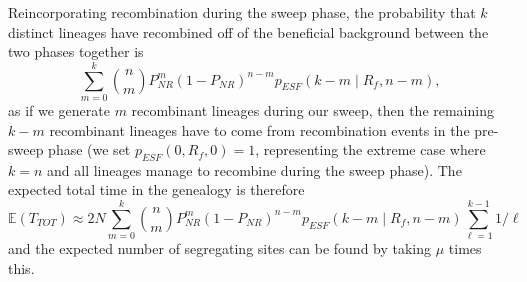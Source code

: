 \documentclass[a4paper,10pt]{article}
\begin{document}
Reincorporating recombination during the sweep phase, the probability that $k$ distinct lineages have recombined off of the beneficial background between the two phases together is
\begin{equation}
	\sum_{m=0}^{k} {n \choose m} P_{NR}^{m} (1-P_{NR})^{n-m} p_{ESF}\left(k-m\mid R_f, n-m\right),
\end{equation}
as if we generate $m$ recombinant lineages during our sweep, then the remaining $k-m$ recombinant lineages have to come from recombination events in the pre-sweep phase (we set $p_{ESF}\left(0,R_f,0\right)=1$, representing the extreme case where $k=n$ and all lineages manage to recombine during the sweep phase). The expected total time in the genealogy is therefore
\begin{equation}
\mathbb{E}(T_{TOT})  \approx 2N\sum_{m=0}^{k} {n \choose m} P_{NR}^{m} (1-P_{NR})^{n-m} p_{ESF}\left(k-m\mid R_f, n-m\right)   \sum_{\ell=1}^{k-1} 1/\ell
\end{equation}
and the expected number of segregating sites can be found by taking $\mu$ times this. 
\end{document}

